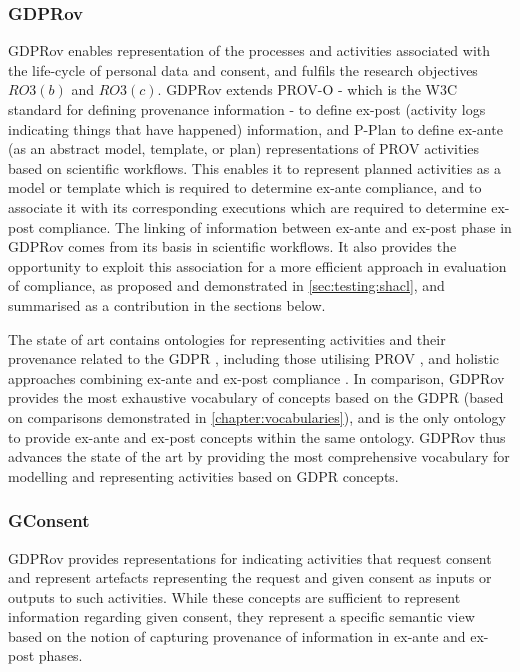 \subsubsection{GDPRov}
GDPRov enables representation of the processes and activities associated with the life-cycle of personal data and consent, and  fulfils the research objectives $RO3(b)$ and $RO3(c)$.
GDPRov extends PROV-O \cite{lebo_prov-o_2013} - which is the W3C standard for defining provenance information - to define ex-post (activity logs indicating things that have happened) information, and P-Plan \cite{garijo_p-plan_2014} to define ex-ante (as an abstract model, template, or plan) representations of PROV activities based on scientific workflows.
This enables it to represent planned activities as a model or template which is required to determine ex-ante compliance, and to associate it with its corresponding executions which are required to determine ex-post compliance.
The linking of information between ex-ante and ex-post phase in GDPRov comes from its basis in scientific workflows. It also provides the opportunity to exploit this association for a more efficient approach in evaluation of compliance, as proposed and demonstrated in \autoref{sec:testing:shacl}, and summarised as a contribution in the sections below.

The state of art contains ontologies for representing activities and their provenance related to the GDPR \cite{pasquier_data_2018,palmirani_pronto_2018-1}, including those utilising PROV \cite{belhajjame_provenance_2018,bonatti_special_2018-1}, and holistic approaches combining ex-ante and ex-post compliance \cite{dullaert_d3.4_2019}.
In comparison, GDPRov provides the most exhaustive vocabulary of concepts based on the GDPR (based on comparisons demonstrated in \autoref{chapter:vocabularies}), and is the only ontology to provide ex-ante and ex-post concepts within the same ontology.
GDPRov thus advances the state of the art by providing the most comprehensive vocabulary for modelling and representing activities based on GDPR concepts.

\subsubsection{GConsent}
GDPRov provides representations for indicating activities that request consent and represent artefacts representing the request and given consent as inputs or outputs to such activities.
While these concepts are sufficient to represent information regarding given consent, they represent a specific semantic view based on the notion of capturing provenance of information in ex-ante and ex-post phases.

